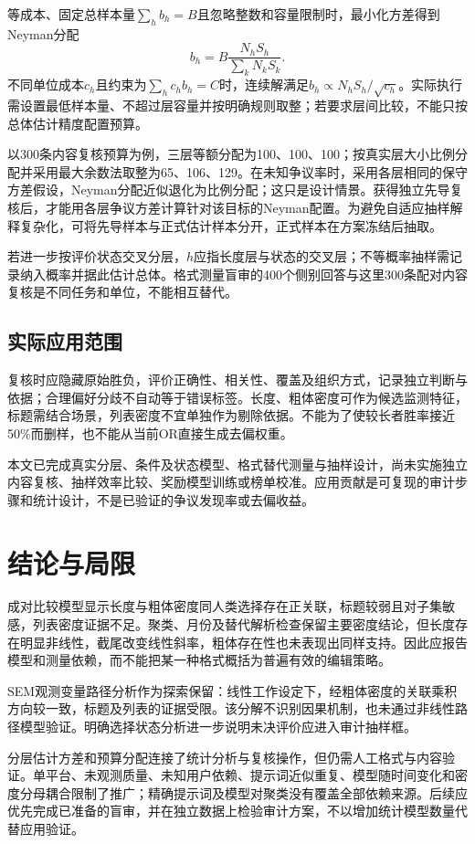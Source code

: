 \documentclass[UTF8,11pt,a4paper,fontset=windows]{ctexart}
\numberwithin{equation}{section}
\begin{document}
等成本、固定总样本量$\sum_hb_h=B$且忽略整数和容量限制时，最小化方差得到Neyman分配
\begin{equation}
 b_h=B\frac{N_hS_h}{\sum_kN_kS_k}.
\end{equation}
不同单位成本$c_h$且约束为$\sum_hc_hb_h=C$时，连续解满足$b_h\propto N_hS_h/\sqrt{c_h}$。实际执行需设置最低样本量、不超过层容量并按明确规则取整；若要求层间比较，不能只按总体估计精度配置预算。

以300条内容复核预算为例，三层等额分配为100、100、100；按真实层大小比例分配并采用最大余数法取整为65、106、129。在未知争议率时，采用各层相同的保守方差假设，Neyman分配近似退化为比例分配；这只是设计情景。获得独立先导复核后，才能用各层争议方差计算针对该目标的Neyman配置。为避免自适应抽样解释复杂化，可将先导样本与正式估计样本分开，正式样本在方案冻结后抽取。

若进一步按评价状态交叉分层，$h$应指长度层与状态的交叉层；不等概率抽样需记录纳入概率并据此估计总体。格式测量盲审的400个侧别回答与这里300条配对内容复核是不同任务和单位，不能相互替代。

\subsection{实际应用范围}
复核时应隐藏原始胜负，评价正确性、相关性、覆盖及组织方式，记录独立判断与依据；合理偏好分歧不自动等于错误标签。长度、粗体密度可作为候选监测特征，标题需结合场景，列表密度不宜单独作为剔除依据。不能为了使较长者胜率接近50\%而删样，也不能从当前OR直接生成去偏权重。

本文已完成真实分层、条件及状态模型、格式替代测量与抽样设计，尚未实施独立内容复核、抽样效率比较、奖励模型训练或榜单校准。应用贡献是可复现的审计步骤和统计设计，不是已验证的争议发现率或去偏收益。

\section{结论与局限}
成对比较模型显示长度与粗体密度同人类选择存在正关联，标题较弱且对子集敏感，列表密度证据不足。聚类、月份及替代解析检查保留主要密度结论，但长度存在明显非线性，截尾改变线性斜率，粗体存在性也未表现出同样支持。因此应报告模型和测量依赖，而不能把某一种格式概括为普遍有效的编辑策略。

SEM观测变量路径分析作为探索保留：线性工作设定下，经粗体密度的关联乘积方向较一致，标题及列表的证据受限。该分解不识别因果机制，也未通过非线性路径模型验证。明确选择状态分析进一步说明未决评价应进入审计抽样框。

分层估计方差和预算分配连接了统计分析与复核操作，但仍需人工格式与内容验证。单平台、未观测质量、未知用户依赖、提示词近似重复、模型随时间变化和密度分母耦合限制了推广；精确提示词及模型对聚类没有覆盖全部依赖来源。后续应优先完成已准备的盲审，并在独立数据上检验审计方案，不以增加统计模型数量代替应用验证。
\end{document}
